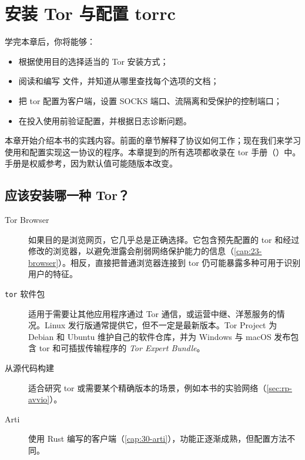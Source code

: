 \chapter{安装 Tor 与配置 torrc}\label{cap:17-torrc}

\begin{obiettivi}
学完本章后，你将能够：
\begin{itemize}[nosep]
  \item 根据使用目的选择适当的 Tor 安装方式；
  \item 阅读和编写  文件，并知道从哪里查找每个选项的文档；
  \item 把 tor 配置为客户端，设置 SOCKS 端口、流隔离和受保护的控制端口；
  \item 在投入使用前验证配置，并根据日志诊断问题。
\end{itemize}
\end{obiettivi}

本章开始介绍本书的实践内容。前面的章节解释了协议如何工作；现在我们来学习使用和配置实现这一协议的程序。本章提到的所有选项都收录在 tor 手册（）中。手册是权威参考，因为默认值可能随版本改变。

\section{应该安装哪一种 Tor？}\label{sec:torrc-installare}

\begin{description}
  \item[Tor Browser] 如果目的是浏览网页，它几乎总是正确选择。它包含预先配置的 tor 和经过修改的浏览器，以避免泄露会削弱网络保护能力的信息（\cref{cap:23-browser}）。相反，直接把普通浏览器连接到 tor 仍可能暴露多种可用于识别用户的特征。
  \item[\texttt{tor} 软件包] 适用于需要让其他应用程序通过 Tor 通信，或运营中继、洋葱服务的情况。Linux 发行版通常提供它，但不一定是最新版本。Tor Project 为 Debian 和 Ubuntu 维护自己的软件仓库，并为 Windows 与 macOS 发布包含 tor 和可插拔传输程序的 \emph{Tor Expert Bundle}。
  \item[从源代码构建] 适合研究 tor 或需要某个精确版本的场景，例如本书的实验网络（\cref{sec:rp-avvio}）。
  \item[Arti] 使用 Rust 编写的客户端（\cref{cap:30-arti}），功能正逐渐成熟，但配置方法不同。
\end{description}

